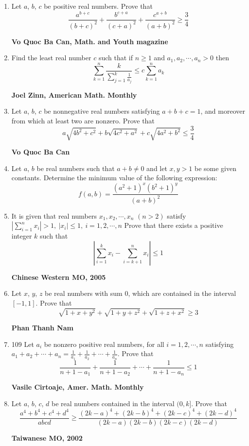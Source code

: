 \documentclass{article}
\begin{document}
\begin{enumerate}
\pagebreak

\item Let $a$, $b$, $c$ be positive real numbers. Prove that$$\frac{a^{b+c}}{(b+c)^2}+\frac{b^{c+a}}{(c+a)^2}+\frac{c^{a+b}}{(a+b)^2}\geq \frac{3}{4}$$
\begin{flushright}
	\textbf{Vo Quoc Ba Can, Math. and Youth magazine}
\end{flushright}
\item Find the least real number $c$ such that if $n\geq 1$ and $a_1,a_2,\cdots ,a_n>0$ then$$\sum \limits_{k=1}^n\frac{k}{\sum \limits_{j=1}^k\frac{1}{a_j}}\leq c\sum \limits_{k=1}^na_k$$
\begin{flushright}
	\textbf{Joel Zinn, American Math. Monthly}
\end{flushright}
\item Let $a$, $b$, $c$ be nonnegative real numbers satisfying $a + b + c = 1$, and moreover from which at least two are nonzero. Prove that $$a \sqrt{4b^2 + c^2} + b \sqrt{4c^2 + a^2} + c \sqrt{4a^2 + b^2} \leq \frac{3}{4}$$
\begin{flushright}
	\textbf{Vo Quoc Ba Can}
\end{flushright}
\item Let $a$, $b$ be real numbers such that $a + b \neq 0$ and let $x, y > 1$ be some given constants. Determine the minimum value of the following expression:$$f(a,b)=\frac{\left(a^2+1\right)^x\left(b^2+1\right)^y}{(a+b)^2}$$
\item It is given that real numbers $x_1, x_2,\cdots , x_n$ $(n > 2)$ satisfy $\left|\sum \limits_{i=1}^n x_i\right|>1,\ \left|x_i\right|\leq 1,\ i=1,2,\cdots, n$ Prove that there exists a positive integer $k$ such that $$\left|\sum \limits_{i=1}^kx_i-\sum \limits_{i=k+1}^nx_i\right|\leq 1$$
\begin{flushright}
	\textbf{Chinese Western MO, 2005}
\end{flushright}
\item Let $x$, $y$, $z$ be real numbers with sum 0, which are contained in the interval $[-1, 1]$. Prove that$$\sqrt{1 + x + y^2} + \sqrt{1 + y + z^2} + \sqrt{1 + z + x^2} \geq 3$$
\begin{flushright}
	\textbf{Phan Thanh Nam}
\end{flushright}
\item 109 Let $a_i$ be nonzero positive real numbers, for all $i = 1,2,\cdots , n$ satisfying $a_1+ a_2+\cdots+ a_n=\frac{1}{a_1}+\frac{1}{a_2}+\cdots+\frac{1}{a_n}$. Prove that$$\frac{1}{n+1-a_1}+\frac{1}{n+1-a_2}+\cdots+\frac{1}{n+1-a_n}\leq 1$$
\begin{flushright}
	\textbf{Vasile Cirtoaje, Amer. Math. Monthly}
\end{flushright}
\item Let $a$, $b$, $c$, $d$ be real numbers contained in the interval $(0, k]$. Prove that $$\frac{a^4 + b^4 + c^4 + d^4}{abcd}\geq \frac{(2k - a)^4 + (2k - b)^4 + (2k - c)^4 + (2k - d)^4}{(2k - a)(2k - b)(2k - c)(2k - d)}$$
\begin{flushright}
	\textbf{Taiwanese MO, 2002}
\end{flushright}


\end{enumerate}
\end{document}
